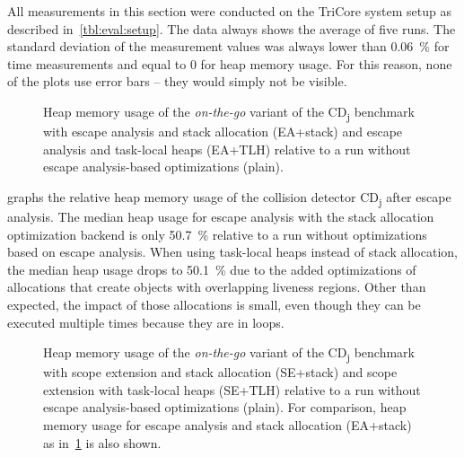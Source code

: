 		All measurements in this section were conducted on the TriCore system setup as described in~\cref{tbl:eval:setup}.
		The data always shows the average of five runs. The standard deviation of the measurement values was always lower
		than 0.06~\% for time measurements and equal to 0 for heap memory usage. For this reason, none of the plots use
		error bars – they would simply not be visible.

		\begin{figure}
			\centering
			

			\caption[Relative heap memory usage of \emph{on-the-go} CD\textsubscript{j} with escape analysis]{%
				Heap memory usage of the \emph{on-the-go} variant of the CD\textsubscript{j} benchmark with escape analysis and stack
				allocation (EA+stack) and escape analysis and task-local heaps (EA+TLH) relative to a run without escape
				analysis-based optimizations (plain).}
			\label{fig:eval:rt:relmem:ea}
		\end{figure}

		 graphs the relative heap memory usage of the collision detector CD\textsubscript{j}
		after escape analysis. The median heap usage for escape analysis with the stack allocation optimization backend is
		only 50.7~\% relative to a run without optimizations based on escape analysis. When using task-local heaps instead
		of stack allocation, the median heap usage drops to 50.1~\% due to the added optimizations of allocations that
		create objects with overlapping liveness regions. Other than expected, the impact of those allocations is small,
		even though they can be executed multiple times because they are in loops.

		\begin{figure}
			\centering
			

			\caption[Relative heap memory usage of \emph{on-the-go} CD\textsubscript{j} with scope extension]{%
				Heap memory usage of the \emph{on-the-go} variant of the CD\textsubscript{j} benchmark with scope extension and
				stack allocation (SE+stack) and scope extension with task-local heaps (SE+TLH) relative to a run without escape
				analysis-based optimizations (plain). For comparison, heap memory usage for escape analysis and stack allocation
				(EA+stack) as in~\cref{fig:eval:rt:relmem:ea} is also shown.}
			\label{fig:eval:rt:relmem:se}
		\end{figure}

